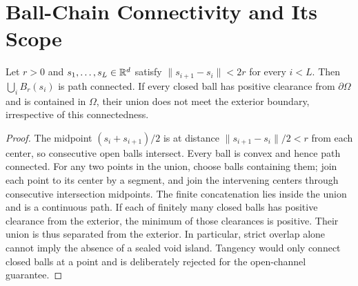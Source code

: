 \section{Ball-Chain Connectivity and Its Scope}
\label{app:ballchain}
\begin{proposition}
Let $r>0$ and $s_1,\ldots,s_L\in\mathbb{R}^d$ satisfy
$\|s_{i+1}-s_i\|<2r$ for every $i<L$.  Then
$\bigcup_i B_r(s_i)$ is path connected.  If every closed ball has positive
clearance from $\partial\Omega$ and is contained in $\Omega$, their union
does not meet the exterior boundary, irrespective of this connectedness.
\end{proposition}
\begin{proof}
The midpoint $(s_i+s_{i+1})/2$ is at distance
$\|s_{i+1}-s_i\|/2<r$ from each center, so consecutive open balls intersect.
Every ball is convex and hence path connected.  For any two points in the
union, choose balls containing them; join each point to its center by a
segment, and join the intervening centers through consecutive intersection
midpoints.  The finite concatenation lies inside the union and is a continuous
path.  If each of finitely many closed balls has positive clearance from the
exterior, the minimum of those clearances is positive.  Their union is thus
separated from the exterior.  In particular, strict overlap alone cannot imply
the absence of a sealed void island.  Tangency would only connect closed
balls at a point and is deliberately rejected for the open-channel guarantee.
\end{proof}
